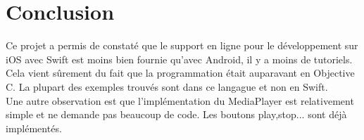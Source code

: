 \section{Conclusion}
Ce projet a permis de constaté que le support en ligne pour le développement sur iOS avec Swift est moins bien fournie qu'avec Android, il y a moins de tutoriels. Cela vient sûrement du fait que la programmation était auparavant en Objective C. La plupart des exemples trouvés sont dans ce langague et non en Swift.\\
Une autre observation est que l'implémentation du MediaPlayer est relativement simple et ne demande pas beaucoup de code. Les boutons play,stop... sont déjà implémentés.